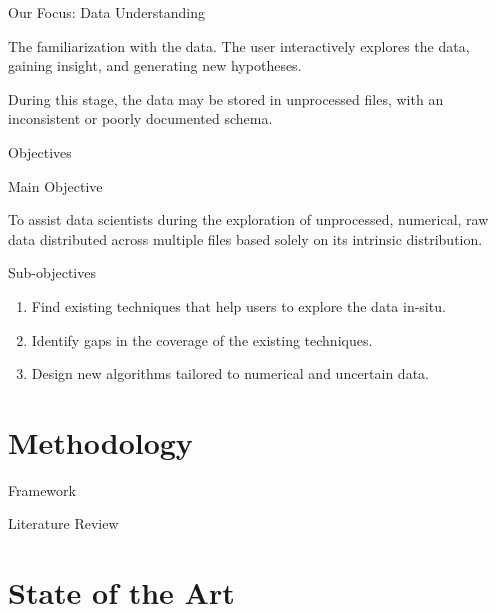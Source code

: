 \documentclass[10pt]{beamer}
\begin{document}
\begin{frame}{Our Focus: Data Understanding}

The \alert{familiarization with the data}. The user interactively explores the
data, gaining insight, and generating new hypotheses.

During this stage, the data may be stored in unprocessed files, with an
inconsistent or poorly documented schema.

\end{frame}

\begin{frame}{Objectives}
\begin{alertblock}{Main Objective}

    To assist data scientists during the exploration of unprocessed, numerical, raw data distributed across multiple
    files based solely on its intrinsic distribution.
\end{alertblock}

\begin{block}{Sub-objectives}
    \begin{enumerate}
        \item Find existing techniques that help users to explore the data in-situ.
        \item Identify gaps in the coverage of the existing techniques.
        \item Design new algorithms tailored to numerical and uncertain data.
    \end{enumerate}
\end{block}
\end{frame}



\section{Methodology}

\begin{frame}{Framework}
\end{frame}

\begin{frame}{Literature Review}
\end{frame}

\section{State of the Art}
\end{document}
